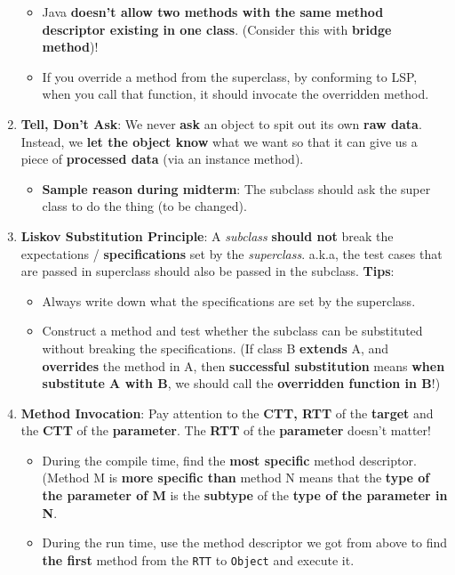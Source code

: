 \documentclass[10pt, landscape]{article}
\begin{document}
\begin{multicols}{4}
\begin{enumerate}
\begin{itemize}
        \item Java \textbf{doesn't allow two methods with the same method descriptor existing in one class}. (Consider this with \textbf{bridge method})!
        \item If you override a method from the superclass, by conforming to LSP, when you call that function, it should invocate the overridden method.
    \end{itemize}
    \item \textbf{Tell, Don't Ask}: We never \textbf{ask} an object to spit out its own \textbf{raw data}. Instead, we \textbf{let the object know} what we want so that it can give us a piece of \textbf{processed data} (via an instance method).
    \begin{itemize}
        \item \textbf{Sample reason during midterm}: The subclass should ask the super class to do the thing (to be changed).
    \end{itemize}
    \item \textbf{Liskov Substitution Principle}: A \textit{subclass} \textbf{should not} break the expectations / \textbf{specifications} set by the \textit{superclass}. a.k.a, the test cases that are passed in superclass should also be passed in the subclass. \textbf{Tips}:
    \begin{itemize}
        \item Always write down what the specifications are set by the superclass.
        \item Construct a method and test whether the subclass can be substituted without breaking the specifications. (If class B \textbf{extends} A, and \textbf{overrides} the method in A, then \textbf{successful substitution} means \textbf{when substitute A with B}, we should call the \textbf{overridden function in B}!)
    \end{itemize}
    \item \textbf{Method Invocation}: Pay attention to the \textbf{CTT, RTT} of the \textbf{target} and the \textbf{CTT} of the \textbf{parameter}. The \textbf{RTT} of the \textbf{parameter} doesn't matter!
    \begin{itemize}
        \item During the compile time, find the \textbf{most specific} method descriptor. (Method M is \textbf{more specific than} method N means that the \textbf{type of the parameter of M} is the \textbf{subtype} of the \textbf{type of the parameter in N}.
        \item During the run time, use the method descriptor we got from above to find \textbf{the first} method from the \texttt{RTT} to \texttt{Object} and execute it.

\end{itemize}
\end{enumerate}
\end{multicols}
\end{document}
